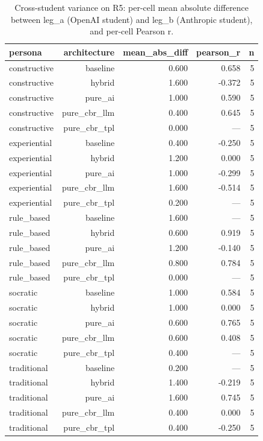 \begin{table}[htbp]
\centering
\caption{Cross-student variance on R5: per-cell mean absolute difference between leg_a (OpenAI student) and leg_b (Anthropic student), and per-cell Pearson r.}
\label{tab:cross-student}
\begin{tabular}{lrrrr}
\toprule
persona & architecture & mean\_abs\_diff & pearson\_r & n \\
\midrule
constructive & baseline & 0.600 & 0.658 & 5 \\
constructive & hybrid & 1.600 & -0.372 & 5 \\
constructive & pure\_ai & 1.000 & 0.590 & 5 \\
constructive & pure\_cbr\_llm & 0.400 & 0.645 & 5 \\
constructive & pure\_cbr\_tpl & 0.000 & --- & 5 \\
experiential & baseline & 0.400 & -0.250 & 5 \\
experiential & hybrid & 1.200 & 0.000 & 5 \\
experiential & pure\_ai & 1.000 & -0.299 & 5 \\
experiential & pure\_cbr\_llm & 1.600 & -0.514 & 5 \\
experiential & pure\_cbr\_tpl & 0.200 & --- & 5 \\
rule\_based & baseline & 1.600 & --- & 5 \\
rule\_based & hybrid & 0.600 & 0.919 & 5 \\
rule\_based & pure\_ai & 1.200 & -0.140 & 5 \\
rule\_based & pure\_cbr\_llm & 0.800 & 0.784 & 5 \\
rule\_based & pure\_cbr\_tpl & 0.000 & --- & 5 \\
socratic & baseline & 1.000 & 0.584 & 5 \\
socratic & hybrid & 1.000 & 0.000 & 5 \\
socratic & pure\_ai & 0.600 & 0.765 & 5 \\
socratic & pure\_cbr\_llm & 0.600 & 0.408 & 5 \\
socratic & pure\_cbr\_tpl & 0.400 & --- & 5 \\
traditional & baseline & 0.200 & --- & 5 \\
traditional & hybrid & 1.400 & -0.219 & 5 \\
traditional & pure\_ai & 1.600 & 0.745 & 5 \\
traditional & pure\_cbr\_llm & 0.400 & 0.000 & 5 \\
traditional & pure\_cbr\_tpl & 0.400 & -0.250 & 5 \\
\bottomrule
\end{tabular}
\end{table}
